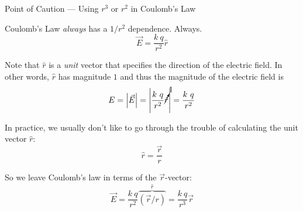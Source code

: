 \documentclass{beamer}
\begin{document}
\begin{frame}{Point of Caution --- Using $r^3$ or $r^2$ in Coulomb's Law}

Coulomb's Law \emph{always} has a $1/r^2$ dependence. Always.
\begin{equation*}
    \vec{E} = \frac{k\ q}{r^2} \hat{r}
\end{equation*}

Note that $\hat{r}$ is a \emph{unit} vector that specifies the direction of the electric field. In other words, $\hat{r}$ has magnitude $1$ and thus the magnitude of the electric field is
\begin{equation*}
    E = \left| \vec{E} \right| = \left| \frac{k\ q}{r^2} \cancelto{1}{\hat{r}} \right| = \frac{k\ q}{r^2}
\end{equation*}

In practice, we usually don't like to go through the trouble of calculating the unit vector $\hat{r}$:
\begin{equation*}
    \hat{r} = \frac{\vec{r}}{r}
\end{equation*}

\vspace{-0.4em}

So we leave Coulomb's law in terms of the $\vec{r}$-vector:
\begin{equation*}
    \vec{E} = \frac{k\ q}{r^2} \overbrace{\left( \vec{r}/r \right)}^{\hat{r}} = \frac{k\ q}{r^3} \vec{r}
\end{equation*}

\end{frame}
\end{document}
